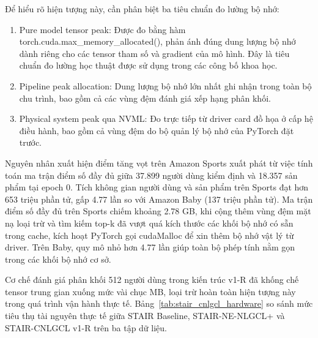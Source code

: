 Để hiểu rõ hiện tượng này, cần phân biệt ba tiêu chuẩn đo lường bộ nhớ:
\begin{enumerate}[leftmargin=*]
    \item Pure model tensor peak: Được đo bằng hàm torch.cuda.max\_memory\_allocated(), phản ánh đúng dung lượng bộ nhớ dành riêng cho các tensor tham số và gradient của mô hình. Đây là tiêu chuẩn đo lường học thuật được sử dụng trong các công bố khoa học.
    \item Pipeline peak allocation: Dung lượng bộ nhớ lớn nhất ghi nhận trong toàn bộ chu trình, bao gồm cả các vùng đệm đánh giá xếp hạng phân khối.
    \item Physical system peak qua NVML: Đo trực tiếp từ driver card đồ họa ở cấp hệ điều hành, bao gồm cả vùng đệm do bộ quản lý bộ nhớ của PyTorch đặt trước.
\end{enumerate}

Nguyên nhân xuất hiện điểm tăng vọt trên Amazon Sports xuất phát từ việc tính toán ma trận điểm số đầy đủ giữa 37.899 người dùng kiểm định và 18.357 sản phẩm tại epoch 0. Tích không gian người dùng và sản phẩm trên Sports đạt hơn 653 triệu phần tử, gấp 4.77 lần so với Amazon Baby (137 triệu phần tử). Ma trận điểm số đầy đủ trên Sports chiếm khoảng 2.78 GB, khi cộng thêm vùng đệm mặt nạ loại trừ và tìm kiếm top-k đã vượt quá kích thước các khối bộ nhớ có sẵn trong cache, kích hoạt PyTorch gọi cudaMalloc để xin thêm bộ nhớ vật lý từ driver. Trên Baby, quy mô nhỏ hơn 4.77 lần giúp toàn bộ phép tính nằm gọn trong các khối bộ nhớ cơ sở.

Cơ chế đánh giá phân khối 512 người dùng trong kiến trúc v1-R đã khống chế tensor trung gian xuống mức vài chục MB, loại trừ hoàn toàn hiện tượng này trong quá trình vận hành thực tế. Bảng~\ref{tab:stair_cnlgcl_hardware} so sánh mức tiêu thụ tài nguyên thực tế giữa STAIR Baseline, STAIR-NE-NLGCL+ và STAIR-CNLGCL v1-R trên ba tập dữ liệu.

